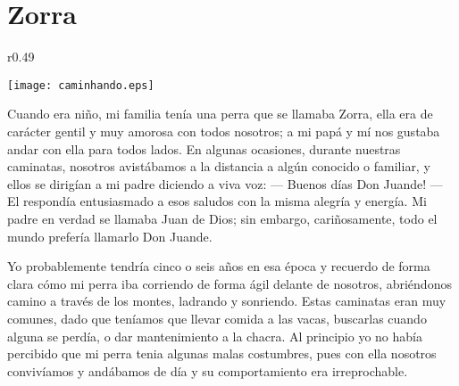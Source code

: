 \cleardoublepage
\newpage
\ifdefined\EnableIncludeImages
\fi
\chapter{Zorra}


\ifdefined\EnableIncludeImages
\begin{wrapfigure}{r}{0.49\textwidth}
  \begin{center}
  \vspace{-30pt}
    \texttt{[image: caminhando.eps]}
  \end{center}
  \vspace{-20pt}
\end{wrapfigure}
\fi
Cuando era niño, mi familia tenía una perra que se llamaba Zorra, ella era de carácter gentil y muy amorosa con todos nosotros; a mi papá y mí nos gustaba andar con ella para todos lados. En algunas ocasiones, durante nuestras caminatas, nosotros avistábamos a la distancia  a algún conocido o familiar, y ellos se dirigían a mi padre diciendo a viva voz: 
--- Buenos días Don Juande! --- 
El respondía entusiasmado a esos saludos con la misma alegría y energía.
Mi padre en verdad se llamaba Juan de Dios; sin embargo, cariñosamente, todo el mundo prefería llamarlo Don Juande.

Yo probablemente tendría cinco o seis años en esa época y recuerdo de forma clara cómo mi perra iba corriendo de forma ágil delante de nosotros, abriéndonos camino a través de los montes, ladrando y sonriendo.
Estas caminatas eran muy comunes, dado que teníamos que llevar comida a las vacas, buscarlas cuando alguna se perdía, o dar mantenimiento a la chacra.
Al principio yo no había percibido que mi perra tenia algunas malas costumbres, pues con ella nosotros convivíamos y andábamos de día y su comportamiento era irreprochable.

